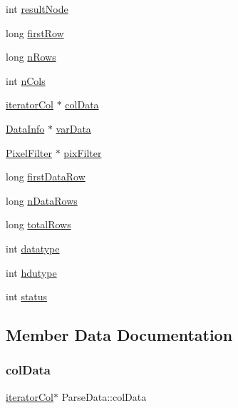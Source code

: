 \begin{DoxyCompactItemize}
\item 
int \hyperlink{struct_parse_data_a19a3e04918ad221706325a927285c956}{result\+Node}
\item 
long \hyperlink{struct_parse_data_a213526cc256748049f96f595b3b2da9d}{first\+Row}
\item 
long \hyperlink{struct_parse_data_ab3c5bfc5827fa18b813cc25ade560dfa}{n\+Rows}
\item 
int \hyperlink{struct_parse_data_ac154871966118175e3b1d12f1d95910f}{n\+Cols}
\item 
\hyperlink{structiterator_col}{iterator\+Col} $\ast$ \hyperlink{struct_parse_data_a62315b409c8ac58398aeb389841c33bb}{col\+Data}
\item 
\hyperlink{struct_data_info}{Data\+Info} $\ast$ \hyperlink{struct_parse_data_a089f0abc9f363773235bde9dc5871cea}{var\+Data}
\item 
\hyperlink{struct_pixel_filter}{Pixel\+Filter} $\ast$ \hyperlink{struct_parse_data_a0a13aa422421ab65962b18be54913579}{pix\+Filter}
\item 
long \hyperlink{struct_parse_data_ab3eef14822a4bc7bc3cb0bf77075c2d9}{first\+Data\+Row}
\item 
long \hyperlink{struct_parse_data_ab75b5ea966c7aabe61d140f2f41fbba6}{n\+Data\+Rows}
\item 
long \hyperlink{struct_parse_data_acd47c533582f0e7eecfcb398c518bf16}{total\+Rows}
\item 
int \hyperlink{struct_parse_data_ae4da4ba748b05fd5aff37244705722ad}{datatype}
\item 
int \hyperlink{struct_parse_data_a7f5b895e61f9b606ea0d8afea7e7c57b}{hdutype}
\item 
int \hyperlink{struct_parse_data_a8a4a0f72437c1787aded1039e2d9e3c4}{status}
\end{DoxyCompactItemize}


\subsection{Member Data Documentation}
\mbox{\label{struct_parse_data_a62315b409c8ac58398aeb389841c33bb}} 
\subsubsection{\texorpdfstring{col\+Data}{colData}}
{\footnotesize\ttfamily \hyperlink{structiterator_col}{iterator\+Col}$\ast$ Parse\+Data\+::col\+Data}

